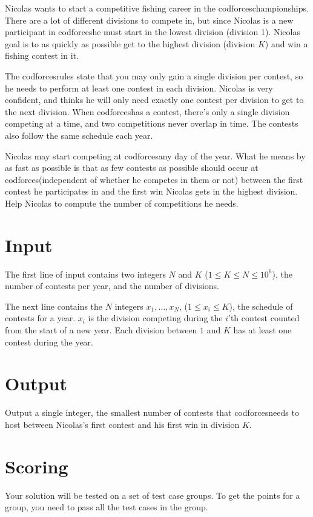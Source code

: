 \def\version{jury-2}
\newcommand{\cf}{codforces\texttrademark{}}
Nicolas wants to start a competitive fishing career in the \cf championships.
There are a lot of different divisions to compete in, but since Nicolas is a new participant in \cf he must start in the lowest division (division 1).
Nicolas goal is to as quickly as possible get to the highest division (division $K$) and win a fishing contest in it.

The \cf rules state that you may only gain a single division per contest, so he needs to perform at least one contest in each division.
Nicolas is very confident, and thinks he will only need exactly one contest per division to get to the next division.
When \cf has a contest, there's only a single division competing at a time, and two competitions never overlap in time.
The contests also follow the same schedule each year.

Nicolas may start competing at \cf any day of the year.
What he means by as fast as possible is that as few contests as possible should occur at \cf (independent of whether he competes in them or not) between the first contest he participates in and the first win Nicolas gets in the highest division.
Help Nicolas to compute the number of competitions he needs.

\section*{Input}
The first line of input contains two integers $N$ and $K$ ($1 \leq K \leq N \leq 10^6$), the number of contests per year, and the number of divisions.

The next line contains the $N$ integers $x_1, \dots, x_N$, ($1 \leq x_i \leq K$), the schedule of contests for a year.
$x_i$ is the division competing during the $i$'th contest counted from the start of a new year.
Each division between $1$ and $K$ has at least one contest during the year.

\section*{Output}
Output a single integer, the smallest number of contests that \cf needs to host between Nicolas's first contest and his first win in division $K$.

\section*{Scoring}
Your solution will be tested on a set of test case groups.
To get the points for a group, you need to pass all the test cases in the group.

